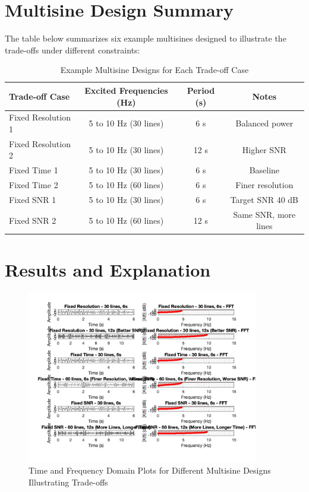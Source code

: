 \documentclass[a4paper,12pt]{article}
\begin{document}
\section*{Multisine Design Summary}
The table below summarizes six example multisines designed to illustrate the trade-offs under different constraints:

\begin{table}[h!]
\centering
\caption{Example Multisine Designs for Each Trade-off Case}
\begin{tabular}{@{}lccc@{}}
\toprule
\textbf{Trade-off Case} & \textbf{Excited Frequencies (Hz)} & \textbf{Period (s)} & \textbf{Notes} \\ \midrule
Fixed Resolution 1 & 5 to 10 Hz (30 lines) & 6 s & Balanced power \\
Fixed Resolution 2 & 5 to 10 Hz (30 lines) & 12 s & Higher SNR \\
Fixed Time 1 & 5 to 10 Hz (30 lines) & 6 s & Baseline \\
Fixed Time 2 & 5 to 10 Hz (60 lines) & 6 s & Finer resolution \\
Fixed SNR 1 & 5 to 10 Hz (30 lines) & 6 s & Target SNR 40 dB \\
Fixed SNR 2 & 5 to 10 Hz (60 lines) & 12 s & Same SNR, more lines \\
\bottomrule
\end{tabular}
\end{table}

\section*{Results and Explanation}

\begin{figure}[h!]
    \centering
    \includegraphics[width=0.9\textwidth]{frftradeoff.jpg}
    \caption{Time and Frequency Domain Plots for Different Multisine Designs Illustrating Trade-offs}
    \label{fig:frf_tradeoff}
\end{figure}
\end{document}
